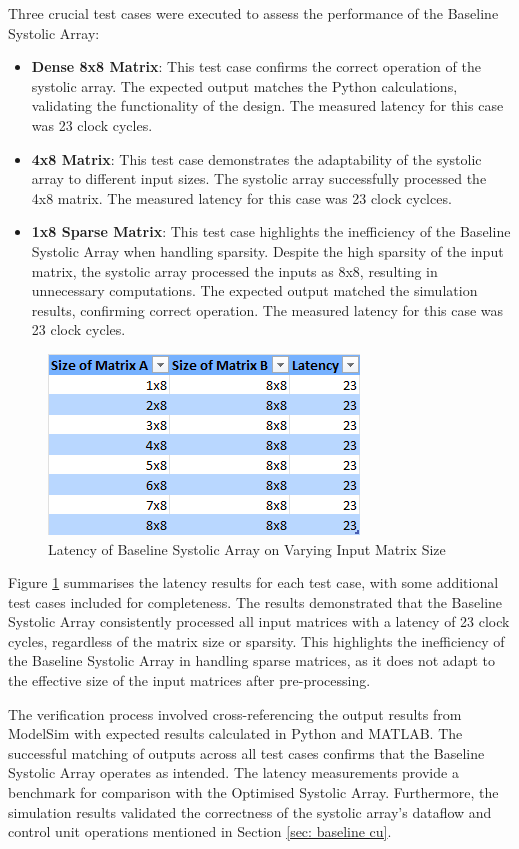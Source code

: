 \documentclass[12pt, a4paper, ukenglish]{article}
\newcommand{\baselineNxEight}{
    \begin{figure}[ht]
        \centering
        \includegraphics[width=0.3\linewidth]{results/Latency of Baseline Systolic Array on Varying Input Matrix Size.png}
        \caption{Latency of Baseline Systolic Array on Varying Input Matrix Size}
        \label{fig:latency_baseline_nxeight}
    \end{figure}
}
\begin{document}
    Three crucial test cases were executed to assess the performance of the Baseline Systolic Array:
    \begin{itemize}
        \item \textbf{Dense 8x8 Matrix}: This test case confirms the correct operation of the systolic array. The expected output matches the Python calculations, validating the functionality of the design. The measured latency for this case was 23 clock cycles.
        
        \item \textbf{4x8 Matrix}: This test case demonstrates the adaptability of the systolic array to different input sizes. The systolic array successfully processed the 4x8 matrix. The measured latency for this case was 23 clock cyclces.
        
        \item \textbf{1x8 Sparse Matrix}: This test case highlights the inefficiency of the Baseline Systolic Array when handling sparsity. Despite the high sparsity of the input matrix, the systolic array processed the inputs as 8x8, resulting in unnecessary computations. The expected output matched the simulation results, confirming correct operation. The measured latency for this case was 23 clock cycles.

    \end{itemize}
    \baselineNxEight

    Figure \ref{fig:latency_baseline_nxeight} summarises the latency results for each test case, with some additional test cases included for completeness. The results demonstrated that the Baseline Systolic Array consistently processed all input matrices with a latency of 23 clock cycles, regardless of the matrix size or sparsity. This highlights the inefficiency of the Baseline Systolic Array in handling sparse matrices, as it does not adapt to the effective size of the input matrices after pre-processing.

    The verification process involved cross-referencing the output results from ModelSim with expected results calculated in Python and MATLAB. The successful matching of outputs across all test cases confirms that the Baseline Systolic Array operates as intended. The latency measurements provide a benchmark for comparison with the Optimised Systolic Array. Furthermore, the simulation results validated the correctness of the systolic array's dataflow and control unit operations mentioned in Section \ref{sec: baseline cu}.
\end{document}
